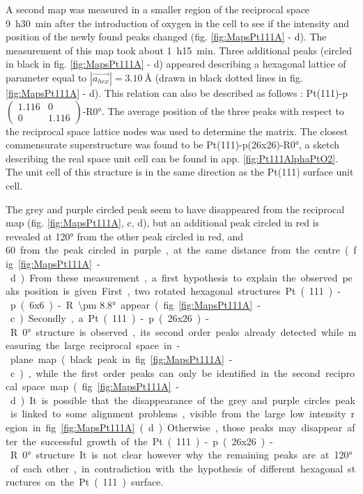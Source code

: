 A second map was measured in a smaller region of the reciprocal space \qty{9}{\hour}\qty{30}{\minute} after the introduction of oxygen in the cell to see if the intensity and position of the newly found peaks changed (fig. \ref{fig:MapsPt111A} - d).
The measurement of this map took about \qty{1}{\hour}\qty{15}{\minute}.
Three additional peaks (circled in black in fig. \ref{fig:MapsPt111A} - d) appeared describing a hexagonal lattice of parameter equal to $|\vec{a_{hex}}| = \qty{3.10}{\angstrom}$ (drawn in black dotted lines in fig. \ref{fig:MapsPt111A} - d).
This relation can also be described as follows : Pt(111)-p$\begin{pmatrix} 1.116 & 0 \\ 0 & 1.116 \end{pmatrix}$-R\ang{0}.
The average position of the three peaks with respect to the reciprocal space lattice nodes was used to determine the matrix.
The closest commensurate superstructure was found to be Pt(111)-p(26x26)-R\ang{0}, a sketch describing the real space unit cell can be found in app. \ref{fig:Pt111AlphaPtO2}.
The unit cell of this structure is in the same direction as the Pt(111) surface unit cell.

The grey and purple circled peak seem to have disappeared from the reciprocal map (fig. \ref{fig:MapsPt111A}, c, d), but an additional peak circled in red is revealed at \ang{120} from the other peak circled in red, and \qty{60} from the peak circled in purple, at the same distance from the centre (fig. \ref{fig:MapsPt111A} - d).
From these measurement, a first hypothesis to explain the observed peaks position is given.
First, two rotated hexagonal structures Pt(111)-p(6x6)-R\ang{\pm 8.8} appear (fig. \ref{fig:MapsPt111A} - c).
Secondly, a Pt(111)-p(26x26)-R\ang{0} structure is observed, its second order peaks already detected while measuring the large reciprocal space in-plane map (black peak in fig. \ref{fig:MapsPt111A} - c), while the first order peaks can only be identified in the second reciprocal space map (fig. \ref{fig:MapsPt111A} - d).
It is possible that the disappearance of the grey and purple circles peak is linked to some alignment problems, visible from the large low intensity region in fig. \ref{fig:MapsPt111A} (d).
Otherwise, those peaks may disappear after the successful growth of the Pt(111)-p(26x26)-R\ang{0} structure.
It is not clear however why the remaining peaks are at \ang{120} of each other, in contradiction with the hypothesis of different hexagonal structures on the Pt(111) surface.

